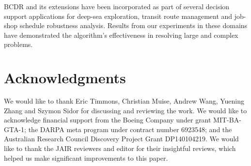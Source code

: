 \documentclass[jair,twoside,11pt,theapa]{article}
\begin{document}
BCDR and its extensions have been
incorporated as part of several decision support applications for deep-sea
exploration, transit route management and job-shop schedule robustness analysis.
Results from our experiments in these domains have demonstrated the algorithm's
effectiveness in resolving large and complex problems.

\section{Acknowledgments}
We would like to thank Eric Timmons, Christian Muise, Andrew Wang, Yuening Zhang and Szymon Sidor for discussing and reviewing the work. We would like to acknowledge financial support from the
Boeing Company under grant MIT-BA-GTA-1; the DARPA meta program under contract number 6923548; and the Australian Research Council Discovery Project Grant DP140104219.  We would like to thank the JAIR reviewers and editor for their insightful reviews, which helped us make significant improvements to this paper.



\end{document}
